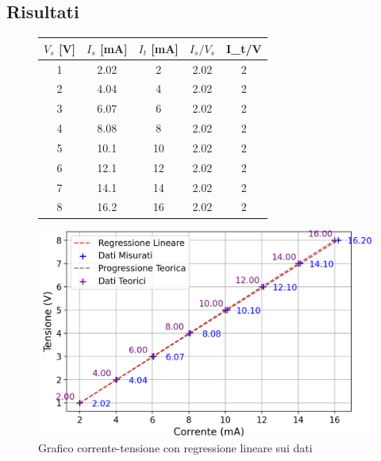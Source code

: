 \subsection{Risultati}
\begin{figure}[ht]
    \centering
    \begin{minipage}{0.35\textwidth}
        \centering
        \begin{tabular}{c|c|c|c|c}
            \toprule
            $V_s$ [V] & $I_s$ [mA] & $I_t$ [mA] & ${I_s}/{V_s}$ &I_t/V\\
            \hline
            \midrule
            1    & 2.02  & 2    & 2.02  & 2\\
            \hline
            2    & 4.04  & 4    & 2.02  & 2\\
            \hline
            3    & 6.07  & 6    & 2.02  & 2\\
            \hline

            4    & 8.08  & 8    & 2.02  & 2\\
            \hline

            5    & 10.1  & 10   & 2.02  & 2\\
            \hline

            6    & 12.1  & 12   & 2.02  & 2\\
            \hline

            7    & 14.1  & 14   & 2.02  & 2\\
            \hline

            8    & 16.2  & 16   & 2.02  & 2\\
            \bottomrule
        \end{tabular}
    \end{minipage}%
    \hspace{0.05\textwidth}
    \begin{minipage}{0.59\textwidth}
        \centering
        \includegraphics[width=\linewidth]{immagine1.png}
        \caption{Grafico corrente-tensione con regressione lineare sui dati}
        \label{fig:immagine}
    \end{minipage}
\end{figure}
